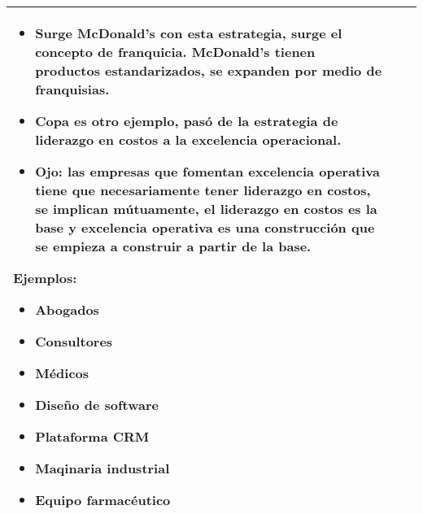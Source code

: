 \begin{center}
\begin{tabular}{ | p{5.8cm} | p{5.8cm} | p{5.8cm} |}
\begin{itemize}
\begin{itemize}
                        \item Surge McDonald's con esta estrategia, surge el concepto de franquicia. McDonald's tienen productos estandarizados, se expanden por medio de franquisias.
                        \item Copa es otro ejemplo, pasó de la estrategia de liderazgo en costos a la excelencia operacional.
                        \item Ojo: las empresas que fomentan excelencia operativa tiene que necesariamente tener liderazgo en costos, se implican mútuamente, el liderazgo en costos es la base y excelencia operativa es una construcción que se empieza a construir a partir de la base.
                    \end{itemize}
            \end{itemize}
            Ejemplos:  
                \begin{itemize}
                    \item Abogados 
                    \item Consultores 
                    \item Médicos 
                    \item Diseño de software 
                    \item Plataforma CRM 
                    \item Maqinaria industrial
                    \item Equipo farmacéutico 
                \end{itemize}
            \\
        \hline
    \end{tabular}
\end{center}


\begin{center}
\end{center}

